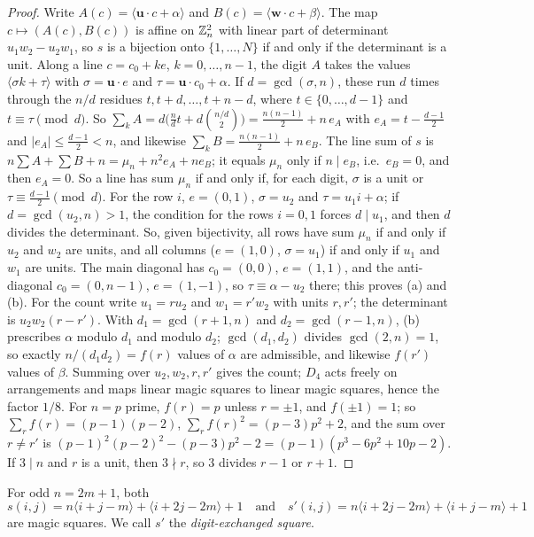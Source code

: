 \begin{proof}
Write $A(c)=\langle\mathbf u\cdot c+\alpha\rangle$ and $B(c)=\langle\mathbf w\cdot c+\beta\rangle$.
The map $c\mapsto(A(c),B(c))$ is affine on $\mathbb{Z}_n^2$ with linear part of determinant $u_1w_2-u_2w_1$, so $s$ is a bijection onto $\{1,\dots,N\}$ if and only if the determinant is a unit.
Along a line $c=c_0+ke$, $k=0,\dots,n-1$, the digit $A$ takes the values $\langle\sigma k+\tau\rangle$ with $\sigma=\mathbf u\cdot e$ and $\tau=\mathbf u\cdot c_0+\alpha$.
If $d=\gcd(\sigma,n)$, these run $d$ times through the $n/d$ residues $t,t+d,\dots,t+n-d$, where $t\in\{0,\dots,d-1\}$ and $t\equiv\tau\pmod d$.
So $\sum_kA=d\bigl(\frac ndt+d\binom{n/d}2\bigr)=\frac{n(n-1)}2+n\,e_A$ with $e_A=t-\frac{d-1}2$ and $|e_A|\le\frac{d-1}2<n$, and likewise $\sum_kB=\frac{n(n-1)}2+n\,e_B$.
The line sum of $s$ is $n\sum A+\sum B+n=\mu_n+n^2e_A+ne_B$; it equals $\mu_n$ only if $n\mid e_B$, i.e.\ $e_B=0$, and then $e_A=0$.
So a line has sum $\mu_n$ if and only if, for each digit, $\sigma$ is a unit or $\tau\equiv\frac{d-1}2\pmod d$.
For the row $i$, $e=(0,1)$, $\sigma=u_2$ and $\tau=u_1i+\alpha$; if $d=\gcd(u_2,n)>1$, the condition for the rows $i=0,1$ forces $d\mid u_1$, and then $d$ divides the determinant.
So, given bijectivity, all rows have sum $\mu_n$ if and only if $u_2$ and $w_2$ are units, and all columns ($e=(1,0)$, $\sigma=u_1$) if and only if $u_1$ and $w_1$ are units.
The main diagonal has $c_0=(0,0)$, $e=(1,1)$, and the anti-diagonal $c_0=(0,n-1)$, $e=(1,-1)$, so $\tau\equiv\alpha-u_2$ there; this proves (a) and (b).
For the count write $u_1=ru_2$ and $w_1=r'w_2$ with units $r,r'$; the determinant is $u_2w_2(r-r')$.
With $d_1=\gcd(r+1,n)$ and $d_2=\gcd(r-1,n)$, (b) prescribes $\alpha$ modulo $d_1$ and modulo $d_2$; $\gcd(d_1,d_2)$ divides $\gcd(2,n)=1$, so exactly $n/(d_1d_2)=f(r)$ values of $\alpha$ are admissible, and likewise $f(r')$ values of $\beta$.
Summing over $u_2,w_2,r,r'$ gives the count; $D_4$ acts freely on arrangements and maps linear magic squares to linear magic squares, hence the factor $1/8$.
For $n=p$ prime, $f(r)=p$ unless $r=\pm1$, and $f(\pm1)=1$; so $\sum_rf(r)=(p-1)(p-2)$, $\sum_rf(r)^2=(p-3)p^2+2$, and the sum over $r\ne r'$ is $(p-1)^2(p-2)^2-(p-3)p^2-2=(p-1)(p^3-6p^2+10p-2)$.
If $3\mid n$ and $r$ is a unit, then $3\nmid r$, so $3$ divides $r-1$ or $r+1$.
\end{proof}

\begin{corollary}
\label{cor:two-linear}
For odd $n=2m+1$, both
\[
s(i,j)=n\langle i+j-m\rangle+\langle i+2j-2m\rangle+1
\quad\text{and}\quad
s'(i,j)=n\langle i+2j-2m\rangle+\langle i+j-m\rangle+1
\]
are magic squares. We call $s'$ the \emph{digit-exchanged square}.
\end{corollary}

